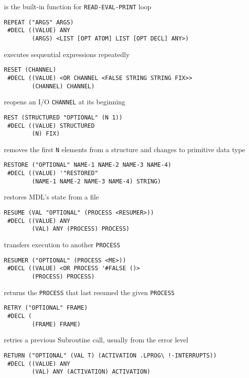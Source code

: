 \documentclass[a4paper,]{article}
\begin{document}
is the built-in function for \texttt{READ-EVAL-PRINT} loop

\begin{verbatim}
REPEAT ("ARGS" ARGS)
 #DECL ((VALUE) ANY
        (ARGS) <LIST [OPT ATOM] LIST [OPT DECL] ANY>)
\end{verbatim}

executes sequential expressions repeatedly

\begin{verbatim}
RESET (CHANNEL)
 #DECL ((VALUE) <OR CHANNEL <FALSE STRING STRING FIX>>
        (CHANNEL) CHANNEL)
\end{verbatim}

reopens an I/O \texttt{CHANNEL} at its beginning

\begin{verbatim}
REST (STRUCTURED "OPTIONAL" (N 1))
 #DECL ((VALUE) STRUCTURED
        (N) FIX)
\end{verbatim}

removes the first \texttt{N} elements from a structure and changes to primitive data type

\begin{verbatim}
RESTORE ("OPTIONAL" NAME-1 NAME-2 NAME-3 NAME-4)
 #DECL ((VALUE) '"RESTORED"
        (NAME-1 NAME-2 NAME-3 NAME-4) STRING)
\end{verbatim}

restores MDL's state from a file

\begin{verbatim}
RESUME (VAL "OPTIONAL" (PROCESS <RESUMER>))
 #DECL ((VALUE) ANY
        (VAL) ANY (PROCESS) PROCESS)
\end{verbatim}

transfers execution to another \texttt{PROCESS}

\begin{verbatim}
RESUMER ("OPTIONAL" (PROCESS <ME>))
 #DECL ((VALUE) <OR PROCESS '#FALSE ()>
        (PROCESS) PROCESS)
\end{verbatim}

returns the \texttt{PROCESS} that last resumed the given \texttt{PROCESS}

\begin{verbatim}
RETRY ("OPTIONAL" FRAME)
 #DECL (
        (FRAME) FRAME)
\end{verbatim}

retries a previous Subroutine call, usually from the error level

\begin{verbatim}
RETURN ("OPTIONAL" (VAL T) (ACTIVATION .LPROG\ !-INTERRUPTS))
 #DECL ((VALUE) ANY
        (VAL) ANY (ACTIVATION) ACTIVATION)
\end{verbatim}
\end{document}
